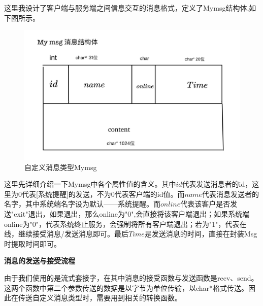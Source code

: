 \documentclass[12pt]{article}
\begin{document}
这里我设计了客户端与服务端之间信息交互的消息格式，定义了Mymsg结构体,如下图所示。
\begin{figure}[H]
        \centering
        \includegraphics[scale=0.18]{fig/3.png}
        \caption{自定义消息类型Mymsg}
       \label{fig:3}
\end{figure}
这里先详细介绍一下Mymsg中各个属性值的含义。其中$id$代表发送消息者的id，这里为0代表[系统提醒]的发送，不为0代表客户端的id值。而$name$代表消息发送者的名字，其中系统端名字设为默认——系统提醒。而$online$代表该客户是否发送"exit"退出，如果退出，那么online为"0",会直接将该客户端退出；如果系统端online为"0"，代表系统终止服务，会强制将所有客户端退出；若为"1"，代表在线，继续接受消息/发送消息即可。最后$Time$是发送消息的时间，直接在封装Msg时提取时间即可。

\vspace{\baselineskip}
\textbf{\large{消息的发送与接受流程}}

由于我们使用的是流式套接字，在其中消息的接受函数与发送函数是recv、send。这两个函数中第二个参数传送的数据是以字节为单位传输，以char*格式传送。因此在传送自定义消息类型时，需要用到相关的转换函数。
\end{document}
